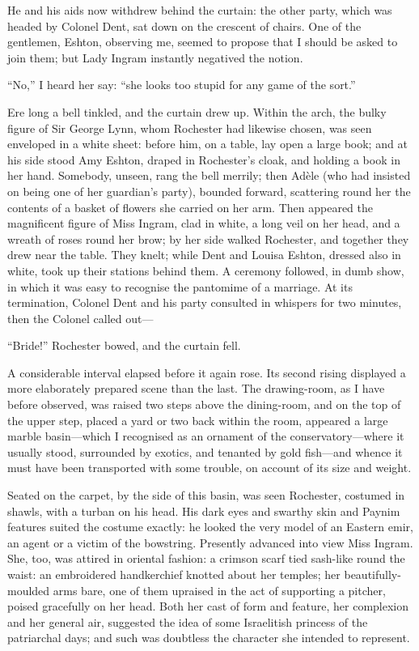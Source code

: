 He and his aids now withdrew behind the curtain: the other party, which
was headed by Colonel Dent, sat down on the crescent of chairs. One of
the gentlemen, \Mr{} Eshton, observing me, seemed to propose that I should
be asked to join them; but Lady Ingram instantly negatived the notion.

\enquote{No,} I heard her say: \enquote{she looks too stupid for any
	game of the sort.}

Ere long a bell tinkled, and the curtain drew up. Within the arch, the
bulky figure of Sir George Lynn, whom \Mr{} Rochester had likewise chosen,
was seen enveloped in a white sheet: before him, on a table, lay open a
large book; and at his side stood Amy Eshton, draped in \Mr{} Rochester's
cloak, and holding a book in her hand. Somebody, unseen, rang the bell
merrily; then Adèle (who had insisted on being one of her guardian's
party), bounded forward, scattering round her the contents of a basket
of flowers she carried on her arm. Then appeared the magnificent figure
of Miss Ingram, clad in white, a long veil on her head, and a wreath of
roses round her brow; by her side walked \Mr{} Rochester, and together
they drew near the table. They knelt; while \Mrs{} Dent and Louisa
Eshton, dressed also in white, took up their stations behind them. A
ceremony followed, in dumb show, in which it was easy to recognise the
pantomime of a marriage. At its termination, Colonel Dent and his party
consulted in whispers for two minutes, then the Colonel called out---

\enquote{Bride!} \Mr{} Rochester bowed, and the curtain fell.

A considerable interval elapsed before it again rose. Its second rising
displayed a more elaborately prepared scene than the last. The
drawing-room, as I have before observed, was raised two steps above the
dining-room, and on the top of the upper step, placed a yard or two back
within the room, appeared a large marble basin---which I recognised as
an ornament of the conservatory---where it usually stood, surrounded by
exotics, and tenanted by gold fish---and whence it must have been
transported with some trouble, on account of its size and weight.

Seated on the carpet, by the side of this basin, was seen \Mr{} Rochester,
costumed in shawls, with a turban on his head. His dark eyes and
swarthy skin and Paynim features suited the costume exactly: he looked
the very model of an Eastern emir, an agent or a victim of the
bowstring. Presently advanced into view Miss Ingram. She, too, was
attired in oriental fashion: a crimson scarf tied sash-like round the
waist: an embroidered handkerchief knotted about her temples; her
beautifully-moulded arms bare, one of them upraised in the act of
supporting a pitcher, poised gracefully on her head. Both her cast of
form and feature, her complexion and her general air, suggested the idea
of some Israelitish princess of the patriarchal days; and such was
doubtless the character she intended to represent.

